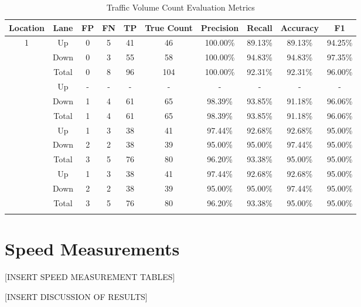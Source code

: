 \begin{table}[H]
    \centering
    \begin{tabular}{|cccccccccc|} 
    \hline
    \textbf{Location} & \textbf{Lane} & \textbf{FP} & \textbf{FN}& \textbf{TP}& \textbf{True Count}&\textbf{Precision}& \textbf{Recall}& \textbf{Accuracy} & \textbf{F1}\\
    \hline
    \multirow{3}{4em}{1}  
    &Up&0&5&41&46&100.00\%&89.13\%&89.13\%&94.25\%\\\cline{2-10}
    &Down&0&3&55&58&100.00\%&94.83\%&94.83\%&97.35\%\\\cline{2-10}
    &Total&0&8&96&104&100.00\%&92.31\%&92.31\%&96.00\%\\\Xhline{1pt}

    \multirow{3}{4em}{2}
    &Up&-&-&-&-&-&-&-&-\\\cline{2-10}
    &Down&1&4&61&65&98.39\%&93.85\%&91.18\%&96.06\%\\\cline{2-10}
    &Total&1&4&61&65&98.39\%&93.85\%&91.18\%&96.06\%\\\Xhline{1pt}

    \multirow{3}{4em}{3}
    &Up&1&3&38&41&97.44\%&92.68\%&92.68\%&95.00\%\\\cline{2-10}
    &Down&2&2&38&39&95.00\%&95.00\%&97.44\%&95.00\%\\\cline{2-10}
    &Total&3&5&76&80&96.20\%&93.38\%&95.00\%&95.00\%\\\Xhline{1pt}

    \multirow{3}{4em}{4}
    &Up&1&3&38&41&97.44\%&92.68\%&92.68\%&95.00\%\\\cline{2-10}
    &Down&2&2&38&39&95.00\%&95.00\%&97.44\%&95.00\%\\\cline{2-10}
    &Total&3&5&76&80&96.20\%&93.38\%&95.00\%&95.00\%\\\Xhline{1pt}


    
\end{tabular}
\caption{Traffic Volume Count Evaluation Metrics}
\end{table}
\raggedbottom

\section{Speed Measurements}

[INSERT SPEED MEASUREMENT TABLES]

[INSERT DISCUSSION OF RESULTS]

